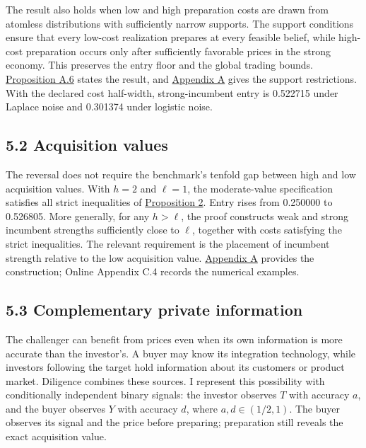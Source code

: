 \documentclass[
  12pt,
]{article}
\begin{document}
The result also holds when low and high preparation costs are drawn from
atomless distributions with sufficiently narrow supports. The support
conditions ensure that every low-cost realization prepares at every
feasible belief, while high-cost preparation occurs only after
sufficiently favorable prices in the strong economy. This preserves the
entry floor and the global trading bounds.
\hyperref[result-proposition-a-6]{Proposition A.6} states the result,
and \hyperref[paper-appendix]{Appendix A} gives the support
restrictions. With the declared cost half-width, strong-incumbent entry
is 0.522715 under Laplace noise and 0.301374 under logistic noise.

\subsection{5.2 Acquisition values}\label{sec-acquisition-values}

The reversal does not require the benchmark's tenfold gap between high
and low acquisition values. With \(h=2\) and \(\ell=1\), the
moderate-value specification satisfies all strict inequalities of
\hyperref[result-proposition-2]{Proposition 2}. Entry rises from
0.250000 to 0.526805. More generally, for any \(h>\ell\), the proof
constructs weak and strong incumbent strengths sufficiently close to
\(\ell\), together with costs satisfying the strict inequalities. The
relevant requirement is the placement of incumbent strength relative to
the low acquisition value. \hyperref[paper-appendix]{Appendix A}
provides the construction; Online Appendix C.4 records the numerical
examples.

\subsection{5.3 Complementary private
information}\label{sec-complementary-private-information}

The challenger can benefit from prices even when its own information is
more accurate than the investor's. A buyer may know its integration
technology, while investors following the target hold information about
its customers or product market. Diligence combines these sources. I
represent this possibility with conditionally independent binary
signals: the investor observes \(T\) with accuracy \(a\), and the buyer
observes \(Y\) with accuracy \(d\), where \(a,d\in(1/2,1)\). The buyer
observes its signal and the price before preparing; preparation still
reveals the exact acquisition value.
\end{document}
